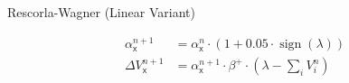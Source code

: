 \documentclass[border=10pt,varwidth]{standalone}
\begin{document}
\begin{center}
	\huge
	\sffamily
	Rescorla-Wagner (Linear Variant)
\end{center}
\newcommand{\eks}{\textsf{x}}
\begin{equation*}
	\begin{aligned}
		\alpha_\eks^{n + 1} &= \alpha_\eks^n \cdot \left(1 + 0.05 \cdot \operatorname{sign} \left( \lambda \right) \right) \\
		\Delta V_{\eks}^{n+1} &= \alpha_\eks^{n + 1} \cdot \beta^+ \cdot \left( \lambda - \textstyle\sum_i V_i^{n} \right)
	\end{aligned}
	\label{linear_alpha}
\end{equation*}
\end{document}
